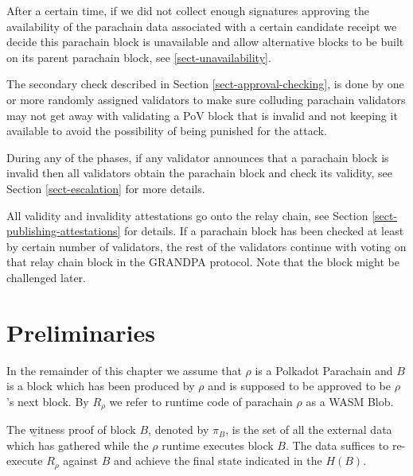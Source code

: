 After a certain time, if we did not collect enough signatures approving the
availability of the parachain data associated with a certain candidate receipt
we decide this parachain block is unavailable and allow alternative blocks to be
built on its parent parachain block, see \ref{sect-unavailability}.
\newline

The secondary check described in Section \ref{sect-approval-checking}, is done
by one or more randomly assigned validators to make sure colluding parachain
validators may not get away with validating a PoV block that is invalid and not
keeping it available to avoid the possibility of being punished for the attack.
\newline

During any of the phases, if any validator announces that a parachain block is
invalid then all validators obtain the parachain block and check its validity,
see Section \ref{sect-escalation} for more details.
\newline

All validity and invalidity attestations go onto the relay chain, see Section
\ref{sect-publishing-attestations} for details. If a parachain block has been
checked at least by certain number of validators, the rest of the validators
continue with voting on that relay chain block in the GRANDPA protocol. Note
that the block might be challenged later.
\newline

\section{Preliminaries}

\begin{definition}
In the remainder of this chapter we assume that $\rho$ is a Polkadot Parachain
and $B$ is a block which has been produced by $\rho$ and is supposed to be
approved to be $\rho$'s next block. By $R_{\rho}$ we refer to runtime code of
parachain $\rho$  as a WASM Blob.
\end{definition}

\begin{definition}
  \label{defn-witness-proof}
  The {\b witness proof} of block $B$, denoted by {\bf $\pi_B$}, is the set of
  all the external data which has gathered while the $\rho$ runtime executes
  block $B$. The data suffices to re-execute $R_{\rho}$ against $B$ and achieve
  the final state indicated in the $H(B)$.
\end{definition}

